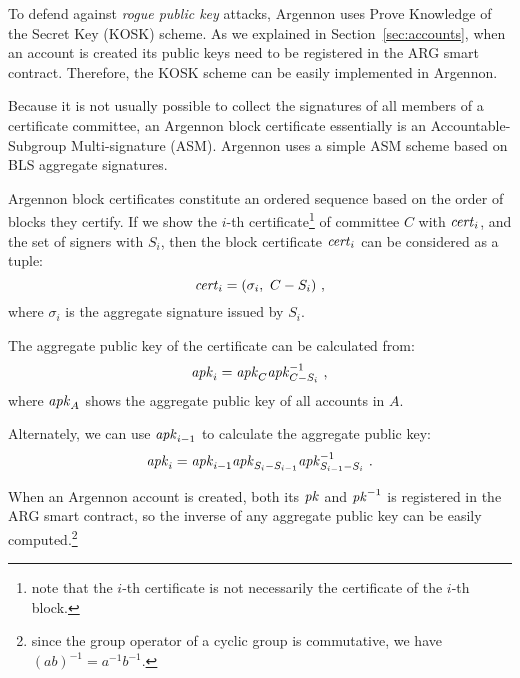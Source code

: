 To defend against \emph{rogue public key} attacks, Argennon uses Prove Knowledge of the Secret Key (KOSK) scheme. As we
explained in Section~\ref{sec:accounts}, when an account is created its public keys need to be registered in
the ARG smart contract. Therefore, the KOSK scheme can be easily implemented in Argennon.

Because it is not usually possible to collect the signatures of all members of a certificate committee, an Argennon
block certificate essentially is an Accountable-Subgroup Multi-signature (ASM). Argennon uses a simple ASM scheme
based on BLS aggregate signatures.

Argennon block certificates constitute an ordered sequence based on the order of blocks they certify. If we show
the $i$-th certificate\footnote{note that the $i$-th certificate is not
necessarily the certificate of the $i$-th block.} of committee $C$ with $\mathit{cert}_i$, and the set of signers
with $S_i$, then the block certificate $\mathit{cert}_i$ can be considered as a tuple:
\begin{equation}
    \C_i=(\sigma_i,\ C-S_{i})\label{eq:cert}\ ,
\end{equation}
where $\sigma_i$ is the aggregate signature issued by $S_i$.

The aggregate public key of the certificate can
be calculated from:
\begin{equation}
    \APK_i=\APK_C\APK_{C-S_i}^{-1}\label{eq:aggCertPK}\ ,
\end{equation}
where $\mathit{apk}_{A}$ shows the aggregate public key of all accounts in $A$.

Alternately, we can use $\mathit{apk}_{i-1}$ to calculate the aggregate public key:
\begin{equation}
    \APK_i=\APK_{i-1}\APK_{S_i-S_{i-1}}\APK_{S_{i-1}-S_i}^{-1}\ .\label{eq:aggPK-2}
\end{equation}

When an Argennon account is created, both its $\mathit{pk}$ and $\mathit{pk}^{-1}$ is registered in the ARG smart contract, so the
inverse of any aggregate public key can be easily computed.\footnote{since the group operator of a cyclic
group is commutative, we have $(ab)^{-1}=a^{-1}b^{-1}$.}

